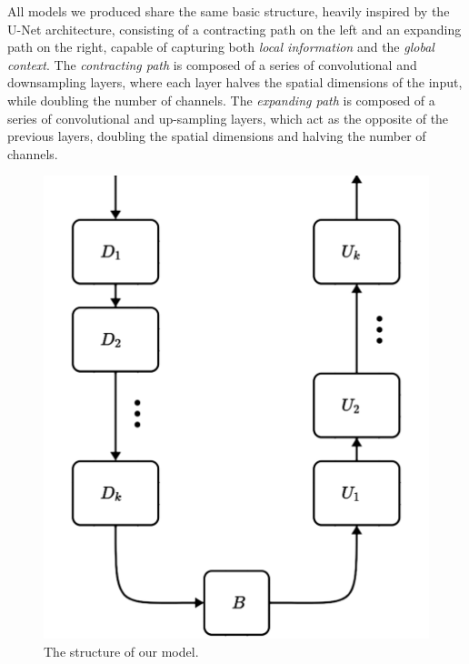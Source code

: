 \documentclass[11pt]{article}
\begin{document}
\begin{multicols}{2}
      All models we produced share the same basic structure, heavily inspired by the U-Net\cite{ronneberger2015unetconvolutionalnetworksbiomedical} architecture, consisting of a contracting path on the left and an expanding path on the right, capable of capturing both \textit{local information} and the \textit{global context}. The \textit{contracting path} is composed of a series of convolutional and downsampling layers, where each layer halves the spatial dimensions of the input, while doubling the number of channels. The \textit{expanding path} is composed of a series of convolutional and up-sampling layers, which act as the opposite of the previous layers, doubling the spatial dimensions and halving the number of channels. 
      \begin{figure}[H]
            \centering
            \includegraphics[width=0.7\linewidth]{model-structure.png}
            \caption{The structure of our model.}
            \label{fig:model_structure}
      \end{figure}


\end{multicols}
\end{document}
